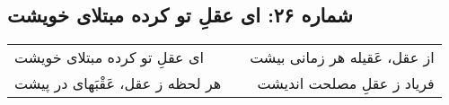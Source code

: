 \begin{center}
\section*{شماره ۲۶: ای عقلِ تو کرده مبتلای خویشت}
\label{sec:026}
\begin{longtable}{l p{0.5cm} r}
ای عقلِ تو کرده مبتلای خویشت
&&
از عقل، عَقیله هر زمانی بیشت
\\
هر لحظه ز عقل، عَقْبَهای در پیشت
&&
فریاد ز عقلِ مصلحت اندیشت
\\
\end{longtable}
\end{center}
